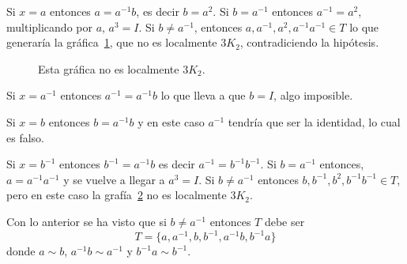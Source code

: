 \documentclass[11pt]{book}
\theoremstyle{definition}
\begin{document}
Si $x=a$ entonces $a=a^{-1}b$, es decir $b=a^2$. Si $b=a^{-1}$
entonces $a^{-1}=a^2$, multiplicando por $a$, $a^3= I$. Si $b \neq
a^{-1}$, entonces $ a, a^{-1}, a^2, a^{-1}a^{-1} \in T$ lo que
generaría la gráfica~\ref{e=a}, que no es localmente $3K_2$,
contradiciendo la hipótesis.



\begin{figure}
  \centering
  \caption{Esta gráfica no es localmente $3K_2$.}\label{e=a}
\end{figure}


Si $x=a^{-1}$ entonces $a^{-1}=a^{-1}b$ lo que lleva a que $b=I$, algo
imposible.


Si $x=b$ entonces $b=a^{-1}b$ y en este caso $a^{-1}$ tendría que ser
la identidad, lo cual es falso.


Si $x=b^{-1}$ entonces $b^{-1}=a^{-1}b$ es decir
$a^{-1}=b^{-1}b^{-1}$. Si $b=a^{-1}$ entonces, $a=a^{-1}a^{-1}$ y se
vuelve a llegar a $a^3=I$. Si $ b\neq a^{-1}$ entonces $b, b^{-1},
b^2, b^{-1}b^{-1}\in T$, pero en este caso la grafía~\ref{e=b-1} no es
localmente $3K_2$.

\begin{figure}
  \centering
  \caption{}\label{e=b-1}
\end{figure}




Con lo anterior se ha visto que si $ b\neq a^{-1}$ entonces $T$ debe
ser $$T=\{a, a^{-1}, b, b^{-1}, a^{-1}b, b^{-1}a\}$$ donde $a\sim b$,
$a^{-1}b\sim a^{-1}$ y $b^{-1}a\sim b^{-1}$.
\end{document}
